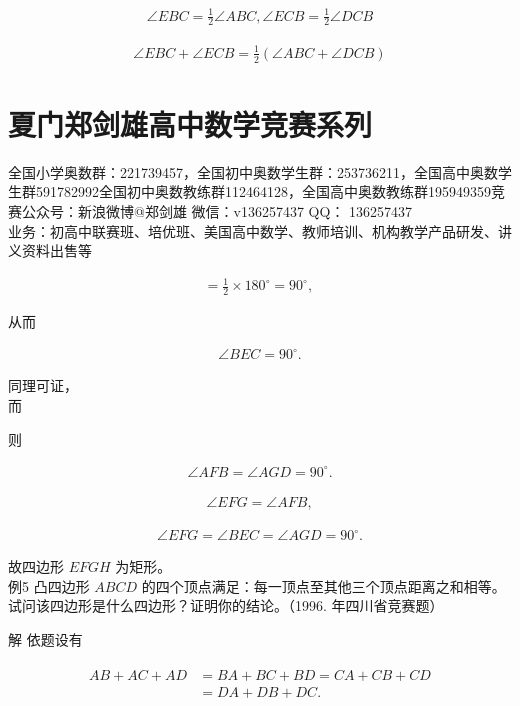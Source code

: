 \documentclass[10pt]{article}
\begin{document}
\begin{align*}
\angle E B C=\frac{1}{2} \angle A B C, \angle E C B=\frac{1}{2} \angle D C B
\end{align*}

\begin{align*}
\angle E B C+\angle E C B=\frac{1}{2}(\angle A B C+\angle D C B)
\end{align*}

\section*{夏门郑剑雄高中数学竞赛系列}
全国小学奥数群：221739457，全国初中奥数学生群：253736211，全国高中奥数学生群591782992全国初中奥数教练群112464128，全国高中奥数教练群195949359竞赛公众号：新浪微博@郑剑雄 微信：v136257437 QQ： 136257437\\
业务：初高中联赛班、培优班、美国高中数学、教师培训、机构教学产品研发、讲义资料出售等

\begin{align*}
=\frac{1}{2} \times 180^{\circ}=90^{\circ} \text {, }
\end{align*}

从而

\begin{align*}
\angle B E C=90^{\circ} .
\end{align*}

同理可证，\\
而

则

\begin{align*}
\angle A F B=\angle A G D=90^{\circ} .
\end{align*}

\begin{align*}
\angle E F G=\angle A F B,
\end{align*}

\begin{align*}
\angle E F G=\angle B E C=\angle A G D=90^{\circ} .
\end{align*}

故四边形 $E F G H$ 为矩形。\\
例5 凸四边形 $A B C D$ 的四个顶点满足：每一顶点至其他三个顶点距离之和相等。试问该四边形是什么四边形？证明你的结论。（1996. 年四川省竞赛题）

解 依题设有

\begin{align*}
\begin{aligned}
A B+A C+A D & =B A+B C+B D=C A+C B+C D \\
& =D A+D B+D C .
\end{aligned}
\end{align*}
\end{document}

